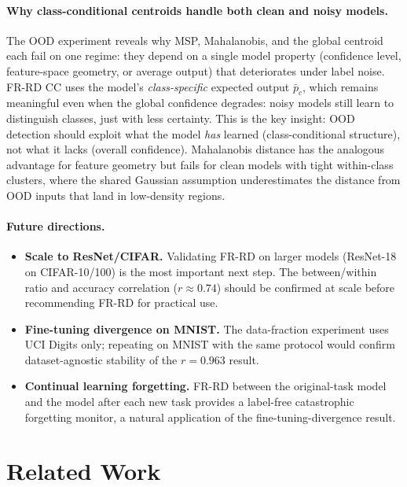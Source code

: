 \documentclass[11pt]{article}
\begin{document}
\paragraph{Why class-conditional centroids handle both clean and noisy models.}
The OOD experiment reveals why MSP, Mahalanobis, and the global centroid each fail on one
regime: they depend on a single model property (confidence level, feature-space geometry, or
average output) that deteriorates under label noise.
FR-RD CC uses the model's \emph{class-specific} expected output $\bar{p}_c$, which remains
meaningful even when the global confidence degrades: noisy models still learn to distinguish
classes, just with less certainty.
This is the key insight: OOD detection should exploit what the model \emph{has} learned
(class-conditional structure), not what it lacks (overall confidence).
Mahalanobis distance has the analogous advantage for feature geometry but fails for clean
models with tight within-class clusters, where the shared Gaussian assumption
underestimates the distance from OOD inputs that land in low-density regions.

\paragraph{Future directions.}
\begin{itemize}
  \item \textbf{Scale to ResNet/CIFAR.} Validating FR-RD on larger models (ResNet-18 on
        CIFAR-10/100) is the most important next step. The between/within ratio and
        accuracy correlation ($r \approx 0.74$) should be confirmed at scale before
        recommending FR-RD for practical use.
  \item \textbf{Fine-tuning divergence on MNIST.} The data-fraction experiment uses UCI
        Digits only; repeating on MNIST with the same protocol would confirm dataset-agnostic
        stability of the $r = 0.963$ result.
  \item \textbf{Continual learning forgetting.} FR-RD between the original-task model and
        the model after each new task provides a label-free catastrophic forgetting monitor,
        a natural application of the fine-tuning-divergence result.
\end{itemize}

\section{Related Work}
\end{document}

